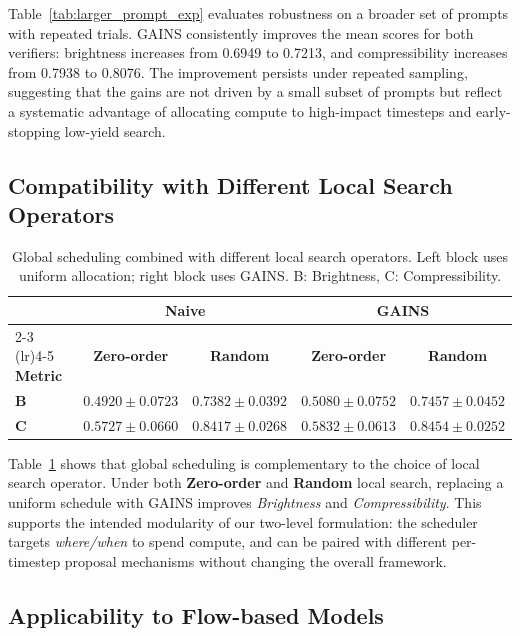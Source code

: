 Table~\ref{tab:larger_prompt_exp} evaluates robustness on a broader set of prompts with repeated trials.
GAINS consistently improves the mean scores for both verifiers: brightness increases from 0.6949 to 0.7213, and compressibility increases from 0.7938 to 0.8076.
The improvement persists under repeated sampling, suggesting that the gains are not driven by a small subset of prompts but reflect a systematic advantage of allocating compute to high-impact timesteps and early-stopping low-yield search.

\subsection{Compatibility with Different Local Search Operators}
\label{sec:exp-local-operator}
\begin{table}[t]
\centering
\caption{Global scheduling combined with different local search operators.
Left block uses uniform allocation; right block uses GAINS.
B: Brightness, C: Compressibility.}
\label{tab:local_search_combo}
\begin{tabular}{lcccc}
\toprule
& \multicolumn{2}{c}{\textbf{Naive}} & \multicolumn{2}{c}{\textbf{GAINS}} \\
\cmidrule(lr){2-3} \cmidrule(lr){4-5}
\textbf{Metric} & \textbf{Zero-order} & \textbf{Random} & \textbf{Zero-order} & \textbf{Random} \\
\midrule
\textbf{B} & $0.4920 \pm 0.0723$ & $0.7382 \pm 0.0392$ & $\mathbf{0.5080 \pm 0.0752}$ & $\mathbf{0.7457 \pm 0.0452}$ \\
\textbf{C} & $0.5727 \pm 0.0660$ & $0.8417 \pm 0.0268$ & $\mathbf{0.5832 \pm 0.0613}$ & $\mathbf{0.8454 \pm 0.0252}$ \\
\bottomrule
\end{tabular}
\end{table}

Table~\ref{tab:local_search_combo} shows that global scheduling is complementary to the choice of local search operator.
Under both \textbf{Zero-order} and \textbf{Random} local search, replacing a uniform schedule with GAINS improves \textit{Brightness} and \textit{Compressibility}.
This supports the intended modularity of our two-level formulation: the scheduler targets \emph{where/when} to spend compute, and can be paired with different per-timestep proposal mechanisms without changing the overall framework.

\subsection{Applicability to Flow-based Models}
\label{sec:exp-flow}

